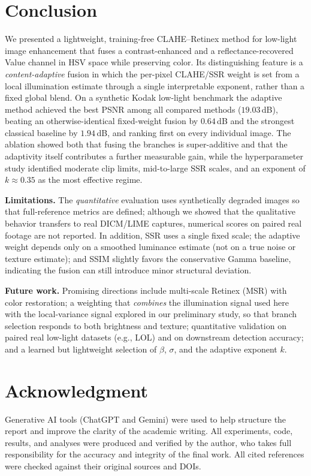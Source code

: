 \documentclass[conference,a4paper]{IEEEtran}
\begin{document}
\section{Conclusion}
We presented a lightweight, training-free CLAHE--Retinex method for low-light
image enhancement that fuses a contrast-enhanced and a reflectance-recovered
Value channel in HSV space while preserving color. Its distinguishing feature is
a \emph{content-adaptive} fusion in which the per-pixel CLAHE/SSR weight is set
from a local illumination estimate through a single interpretable exponent,
rather than a fixed global blend. On a synthetic Kodak low-light benchmark the
adaptive method achieved the best PSNR among all compared methods
($19.03$\,dB), beating an otherwise-identical fixed-weight fusion by
$0.64$\,dB and the strongest classical baseline by $1.94$\,dB, and ranking first
on every individual image. The ablation showed both that fusing the branches is
super-additive and that the adaptivity itself contributes a further measurable
gain, while the hyperparameter study identified moderate clip limits,
mid-to-large SSR scales, and an exponent of $k\!\approx\!0.35$ as the most
effective regime.

\textbf{Limitations.} The \emph{quantitative} evaluation uses synthetically
degraded images so that full-reference metrics are defined; although we showed
that the qualitative behavior transfers to real DICM/LIME captures, numerical
scores on paired real footage are not reported. In addition, SSR uses a single
fixed scale; the adaptive weight depends only on a smoothed luminance estimate
(not on a true noise or texture estimate); and SSIM slightly favors the
conservative Gamma baseline, indicating the fusion can still introduce minor
structural deviation.

\textbf{Future work.} Promising directions include multi-scale Retinex (MSR)
with color restoration; a weighting that \emph{combines} the illumination signal
used here with the local-variance signal explored in our preliminary study, so
that branch selection responds to both brightness and texture; quantitative
validation on paired real low-light datasets (e.g., LOL) and on downstream
detection accuracy; and a learned but lightweight selection of $\beta$,
$\sigma$, and the adaptive exponent $k$.

\section*{Acknowledgment}
Generative AI tools (ChatGPT and Gemini) were used to help structure the report
and improve the clarity of the academic writing. All experiments, code,
results, and analyses were produced and verified by the author, who takes full
responsibility for the accuracy and integrity of the final work. All cited
references were checked against their original sources and DOIs.
\end{document}
